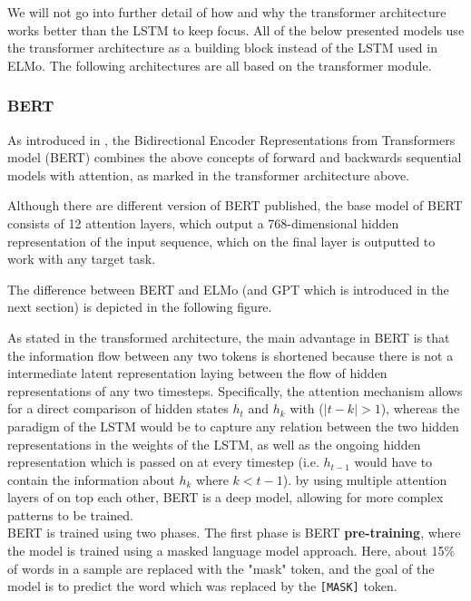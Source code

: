 \documentclass[a4paper,12pt,twoside,openright]{report}
\begin{document}
We will not go into further detail of how and why the transformer architecture works better than the LSTM to keep focus.
All of the below presented models use the transformer architecture as a building block instead of the LSTM used in ELMo.
The following architectures are all based on the transformer module.

\subsubsection{BERT}\label{section:BERT}
 
As introduced in \cite{devlin18}, the Bidirectional Encoder Representations from Transformers model (BERT) combines the above concepts of forward and backwards sequential models with attention, as marked in the transformer architecture above.

Although there are different version of BERT published, the base model of BERT consists of 12 attention layers, which output a 768-dimensional hidden representation of the input sequence, which on the final layer is outputted to work with any target task.

The difference between BERT and ELMo (and GPT which is introduced in the next section) is depicted in the following figure.


As stated in the transformed architecture, the main advantage in BERT is that the information flow between any two tokens is shortened because there is not a intermediate latent representation laying between the flow of hidden representations of any two timesteps.
Specifically, the attention mechanism allows for a direct comparison of hidden states $h_t$ and $h_k$ with ($|t - k| > 1$), whereas the paradigm of the LSTM would be to capture any relation between the two hidden representations in the weights of the LSTM, as well as the ongoing hidden representation which is passed on at every timestep (i.e. $h_{t-1}$ would have to contain the information about $h_k$ where $k < t - 1$).
by using multiple attention layers of on top each other, BERT is a deep model, allowing for more complex patterns to be trained. \\

BERT is trained using two phases. 
The first phase is BERT \textbf{pre-training}, where the model is trained using a masked language model approach. 
Here, about 15\% of words in a sample are replaced with the "mask" token, and the goal of the model is to predict the word which was replaced by the \Verb#[MASK]# token.
\end{document}
